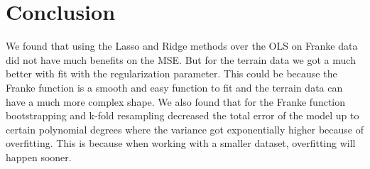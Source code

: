 \section{Conclusion}



We found that using the Lasso and Ridge methods over the OLS on Franke data did not have much benefits on the MSE. But for the terrain data we got a much better with fit with the regularization parameter. This could be because the Franke function is a smooth and easy function to fit and the terrain data can have a much more complex shape. We also found that for the Franke function bootstrapping and k-fold resampling decreased the total error of the model up to certain polynomial degrees where the variance got exponentially higher because of overfitting. This is because when working with a smaller dataset, overfitting will happen sooner. 
